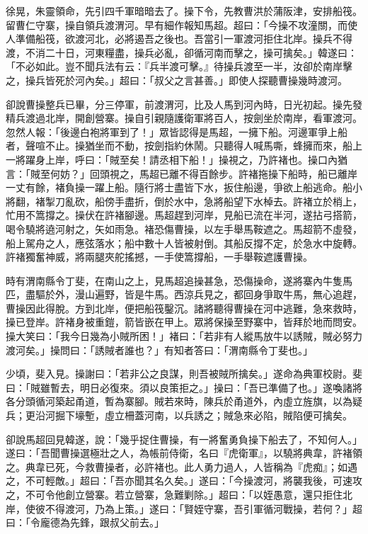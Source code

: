 徐晃，朱靈領命，先引四千軍暗暗去了。操下令，先教曹洪於蒲阪津，安排船筏。留曹仁守寨，操自領兵渡渭河。早有細作報知馬超。超曰：「今操不攻潼關，而使人準備船筏，欲渡河北，必將遏吾之後也。吾當引一軍渡河拒住北岸。操兵不得渡，不消二十日，河東糧盡，操兵必亂，卻循河南而擊之，操可擒矣。」韓遂曰：「不必如此。豈不聞兵法有云：『兵半渡可擊。』待操兵渡至一半，汝卻於南岸擊之，操兵皆死於河內矣。」超曰：「叔父之言甚善。」即使人探聽曹操幾時渡河。

卻說曹操整兵已畢，分三停軍，前渡渭河，比及人馬到河內時，日光初起。操先發精兵渡過北岸，開創營寨。操自引親隨護衛軍將百人，按劍坐於南岸，看軍渡河。忽然人報：「後邊白袍將軍到了！」眾皆認得是馬超，一擁下船。河邊軍爭上船者，聲喧不止。操猶坐而不動，按劍指約休鬧。只聽得人喊馬嘶，蜂擁而來，船上一將躍身上岸，呼曰：「賊至矣！請丞相下船！」操視之，乃許褚也。操口內猶言：「賊至何妨？」回頭視之，馬超已離不得百餘步。許褚拖操下船時，船已離岸一丈有餘，褚負操一躍上船。隨行將士盡皆下水，扳住船邊，爭欲上船逃命。船小將翻，褚掣刀亂砍，船傍手盡折，倒於水中，急將船望下水棹去。許褚立於梢上，忙用不篙撐之。操伏在許褚腳邊。馬超趕到河岸，見船已流在半河，遂拈弓搭箭，喝令驍將遶河射之，矢如雨急。褚恐傷曹操，以左手舉馬鞍遮之。馬超箭不虛發，船上駕舟之人，應弦落水；船中數十人皆被射倒。其船反撐不定，於急水中旋轉。許褚獨奮神威，將兩腿夾舵搖撼，一手使篙撐船，一手舉鞍遮護曹操。

時有渭南縣令丁斐，在南山之上，見馬超追操甚急，恐傷操命，遂將寨內牛隻馬匹，盡驅於外，漫山遍野，皆是牛馬。西涼兵見之，都回身爭取牛馬，無心追趕，曹操因此得脫。方到北岸，便把船筏鑿沉。諸將聽得曹操在河中逃難，急來救時，操已登岸。許褚身被重鎧，箭皆嵌在甲上。眾將保操至野寨中，皆拜於地而問安。操大笑曰：「我今日幾為小賊所困！」褚曰：「若非有人縱馬放牛以誘賊，賊必努力渡河矣。」操問曰：「誘賊者誰也？」有知者答曰：「渭南縣令丁斐也。」

少頃，斐入見。操謝曰：「若非公之良謀，則吾被賊所擒矣。」遂命為典軍校尉。斐曰：「賊雖暫去，明日必復來。須以良策拒之。」操曰：「吾已準備了也。」遂喚諸將各分頭循河築起甬道，暫為寨腳。賊若來時，陳兵於甬道外，內虛立旌旗，以為疑兵；更沿河掘下壕塹，虛立柵蓋河南，以兵誘之；賊急來必陷，賊陷便可擒矣。

卻說馬超回見韓遂，說：「幾乎捉住曹操，有一將奮勇負操下船去了，不知何人。」遂曰：「吾聞曹操選極壯之人，為帳前侍衛，名曰『虎衛軍』，以驍將典韋，許褚領之。典韋已死，今救曹操者，必許褚也。此人勇力過人，人皆稱為『虎痴』；如遇之，不可輕敵。」超曰：「吾亦聞其名久矣。」遂曰：「今操渡河，將襲我後，可速攻之，不可令他創立營寨。若立營寨，急難剿除。」超曰：「以姪愚意，還只拒住北岸，使彼不得渡河，乃為上策。」遂曰：「賢姪守寨，吾引軍循河戰操，若何？」超曰：「令龐德為先鋒，跟叔父前去。」

